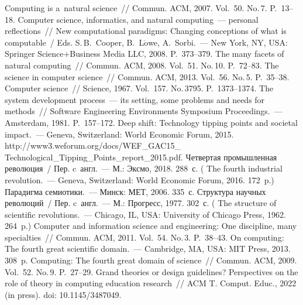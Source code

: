 {\begin{multicols}{2}
  {\small\frenchspacing
   {%
   \begin{thebibliography}{99}
    Computing is a~natural science~// Commun.  ACM, 2007. Vol.~50. No.\,7. P.~13--18.
 Computer science, informatics, and natural computing~--- 
personal reflections~// New computational paradigms: Changing conceptions of 
what is computable~/ Eds. S.\,B.~Cooper, B.~L$\ddot{\mbox{o}}$we, 
A.~Sorbi.~--- New York, NY, USA: Springer Science\;+\;Business Media LLC, 
2008. P.~373--379.
 The many facets of natural computing~// Commun. 
ACM, 2008. Vol.~51. No.\,10. P.~72--83.
 The science in computer science~// Commun.  ACM, 2013. 
Vol.~56. No.\,5. P.~35--38.
 Computer science~// Science, 1967. 
Vol.~157. No.\,3795. P.~1373--1374.
 The system development 
process~--- its setting, some problems and needs for methods~// Software 
Engineering Environments Symposium Proceedings.~--- Amsterdam, 1981. P.~157--172.
Deep shift: Technology tipping points and societal impact.~--- Geneva, 
Switzerland: World Economic Forum, 2015. {\sf 
http://www3.weforum.org/docs/WEF\_GAC15\_ Technological\_Tipping\_Points\_report\_2015.pdf.}
 Четвертая промышленная революция~/ Пер. c~англ.~--- М.: 
Эксмо, 2018. 288~с. ( The fourth industrial revolution.~--- 
Geneva, Switzerland: World Economic Forum, 2016. 172~p.)
 Парадигма семиотики.~--- Минск: МЕТ, 2006. 335~с.
 Структура научных революций~/ Пер. c~англ.~--- М.: Прогресс, 
1977. 302~с. ( The structure of scientific revolutions.~--- Chicago, 
IL, USA: University of Chicago Press, 1962. 264~p.)
 Computer and information science and engineering: One discipline, 
many specialties~// Commun. ACM, 2011. Vol.~54. No.\,3. P.~38--43.
 On computing: The fourth great scientific domain.~--- 
Cambridge, MA, USA: MIT Press, 2013. 308~p.
 Computing: The fourth great domain of 
science~// Commun. ACM, 2009. Vol.~52. No.\,9. P.~27--29.
 Grand theories or design guidelines? Perspectives on 
the role of theory in computing education research~// ACM T. Comput. Educ., 
2022 (in press). doi: 10.1145/3487049.
  

\end{thebibliography}}}
\end{multicols}}
